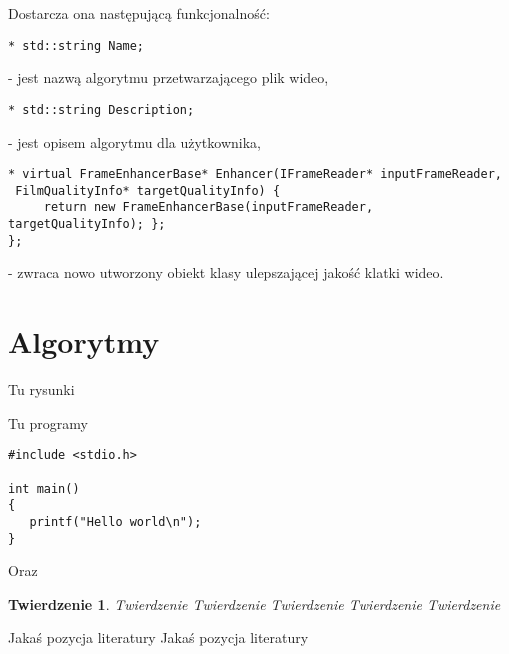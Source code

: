 \documentclass[twoside]{projektInzynierskiMS}
\newtheorem{tw}{Twierdzenie}%
\begin{document}
Dostarcza ona następującą funkcjonalność:
\begin{verbatim}
* std::string Name;
\end{verbatim}
 - jest nazwą algorytmu przetwarzającego plik wideo,
 \begin{verbatim}
* std::string Description;
\end{verbatim}
 - jest opisem algorytmu dla użytkownika,
\begin{verbatim}
* virtual FrameEnhancerBase* Enhancer(IFrameReader* inputFrameReader,
 FilmQualityInfo* targetQualityInfo) { 
     return new FrameEnhancerBase(inputFrameReader, targetQualityInfo); };
};
\end{verbatim} 
 - zwraca nowo utworzony obiekt klasy ulepszającej jakość klatki wideo.





\section{Algorytmy}



          

Tu rysunki


Tu programy

\begin{verbatim}
#include <stdio.h>

int main()
{
   printf("Hello world\n");
}
\end{verbatim}

\noindent
Oraz 

\bigskip

\vrule\hspace{10pt}\begin{minipage}{10cm}
\end{minipage}

\begin{tw}
Twierdzenie Twierdzenie Twierdzenie Twierdzenie Twierdzenie 
\end{tw}
\begin{thebibliography}{12}

 Jakaś pozycja literatury
 Jakaś pozycja literatury

\end{thebibliography}
\end{document}
